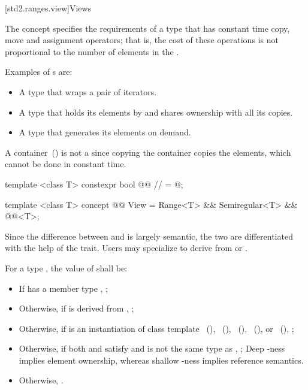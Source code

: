 [std2.ranges.view]{Views}

\pnum
The  concept specifies the requirements of a
 type that has constant time copy, move and assignment operators; that
is, the cost of these operations is not proportional to the number of elements in
the .

\pnum
\enterexample
Examples of s are:

\begin{itemize}
\item A  type that wraps a pair of iterators.

\item A  type that holds its elements by 
and shares ownership with all its copies.

\item A  type that generates its elements on demand.
\end{itemize}

A container~() is not a  since copying the
container copies the elements, which cannot be done in constant time.
\exitexample

\begin{itemdecl}
template <class T>
constexpr bool @@ // \expos
  = @\seebelow@;

template <class T>
concept @@ View =
  Range<T> &&
  Semiregular<T> &&
  @@<T>;
\end{itemdecl}

\begin{itemdescr}
\pnum
Since the difference between  and  is largely semantic, the
two are differentiated with the help of the 
trait. Users may specialize 
to derive from  or .

\pnum
For a type , the value of  shall be:
\begin{itemize}
\item If  has a member type , ;
\item Otherwise, if  is derived from , ;
\item Otherwise, if  is an instantiation of class template
~(),
~(),
~(),
~(), or
~(), ;
\item Otherwise, if both  and  satisfy  and
 is not the same type as ,
; \enternote Deep -ness implies element ownership, whereas shallow -ness
implies reference semantics. \exitnote
\item Otherwise, .
\end{itemize}
\end{itemdescr}

